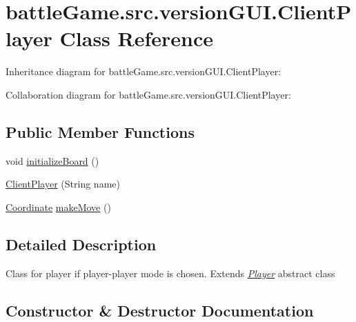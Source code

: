\hypertarget{classbattleGame_1_1src_1_1versionGUI_1_1ClientPlayer}{}\section{battle\+Game.\+src.\+version\+G\+U\+I.\+Client\+Player Class Reference}
\label{classbattleGame_1_1src_1_1versionGUI_1_1ClientPlayer}


Inheritance diagram for battle\+Game.\+src.\+version\+G\+U\+I.\+Client\+Player\+:


Collaboration diagram for battle\+Game.\+src.\+version\+G\+U\+I.\+Client\+Player\+:
\subsection*{Public Member Functions}
\begin{DoxyCompactItemize}
\item 
void \hyperlink{classbattleGame_1_1src_1_1versionGUI_1_1ClientPlayer_a454389a387114eee24b5e9a935fad929}{initialize\+Board} ()
\item 
\hyperlink{classbattleGame_1_1src_1_1versionGUI_1_1ClientPlayer_a6a7da6312cee64738d057e34e5fb9cee}{Client\+Player} (String name)
\item 
\hyperlink{classbattleGame_1_1src_1_1versionGUI_1_1Coordinate}{Coordinate} \hyperlink{classbattleGame_1_1src_1_1versionGUI_1_1ClientPlayer_a7df778ac70a129c97fe0227ecd7acea7}{make\+Move} ()
\end{DoxyCompactItemize}


\subsection{Detailed Description}
Class for player if player-\/player mode is chosen. Extends {\itshape \hyperlink{classbattleGame_1_1src_1_1versionGUI_1_1Player}{Player}} abstract class 

\subsection{Constructor \& Destructor Documentation}
